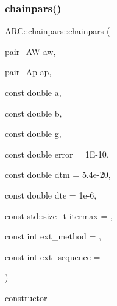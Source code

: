\subsubsection{\texorpdfstring{chainpars()}{chainpars()}\hspace{0.1cm}{\footnotesize\ttfamily [2/2]}}
{\footnotesize\ttfamily A\+R\+C\+::chainpars\+::chainpars (\begin{DoxyParamCaption}\item[{\hyperlink{namespaceARC_a5c4308ca4a8d0e0ff59fdce30f00274c}{pair\+\_\+\+AW}}]{aw,  }\item[{\hyperlink{namespaceARC_a819446c4644b3a3af7ef11574d0b55e0}{pair\+\_\+\+Ap}}]{ap,  }\item[{const double}]{a,  }\item[{const double}]{b,  }\item[{const double}]{g,  }\item[{const double}]{error = {\ttfamily 1E-\/10},  }\item[{const double}]{dtm = {\ttfamily 5.4e-\/20},  }\item[{const double}]{dte = {\ttfamily 1e-\/6},  }\item[{const std\+::size\+\_\+t}]{itermax = {},  }\item[{const int}]{ext\+\_\+method = {},  }\item[{const int}]{ext\+\_\+sequence = {} }\end{DoxyParamCaption})\hspace{0.3cm}{\ttfamily [inline]}}



constructor 


